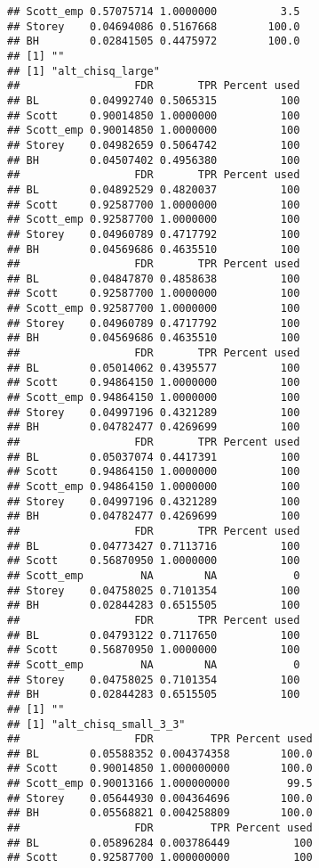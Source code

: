 \documentclass{article}\usepackage[]{graphicx}\usepackage[]{color}
\makeatletter
\newenvironment{kframe}{%
 \def\at@end@of@kframe{}%
 \ifinner\ifhmode%
  \def\at@end@of@kframe{\end{minipage}}%
  \begin{minipage}{\columnwidth}%
 \fi\fi%
 \def\FrameCommand##1{\hskip\@totalleftmargin \hskip-\fboxsep
 \colorbox{shadecolor}{##1}\hskip-\fboxsep
     \hskip-\linewidth \hskip-\@totalleftmargin \hskip\columnwidth}%
 \MakeFramed {\advance\hsize-\width
   \@totalleftmargin\z@ \linewidth\hsize
   \@setminipage}}%
 {\par\unskip\endMakeFramed%
 \at@end@of@kframe}
\newenvironment{knitrout}{}{} %
\makeatother
\begin{document}
\begin{knitrout}
\begin{kframe}
\begin{verbatim}
## Scott_emp 0.57075714 1.0000000          3.5
## Storey    0.04694086 0.5167668        100.0
## BH        0.02841505 0.4475972        100.0
## [1] ""
## [1] "alt_chisq_large"
##                  FDR       TPR Percent used
## BL        0.04992740 0.5065315          100
## Scott     0.90014850 1.0000000          100
## Scott_emp 0.90014850 1.0000000          100
## Storey    0.04982659 0.5064742          100
## BH        0.04507402 0.4956380          100
##                  FDR       TPR Percent used
## BL        0.04892529 0.4820037          100
## Scott     0.92587700 1.0000000          100
## Scott_emp 0.92587700 1.0000000          100
## Storey    0.04960789 0.4717792          100
## BH        0.04569686 0.4635510          100
##                  FDR       TPR Percent used
## BL        0.04847870 0.4858638          100
## Scott     0.92587700 1.0000000          100
## Scott_emp 0.92587700 1.0000000          100
## Storey    0.04960789 0.4717792          100
## BH        0.04569686 0.4635510          100
##                  FDR       TPR Percent used
## BL        0.05014062 0.4395577          100
## Scott     0.94864150 1.0000000          100
## Scott_emp 0.94864150 1.0000000          100
## Storey    0.04997196 0.4321289          100
## BH        0.04782477 0.4269699          100
##                  FDR       TPR Percent used
## BL        0.05037074 0.4417391          100
## Scott     0.94864150 1.0000000          100
## Scott_emp 0.94864150 1.0000000          100
## Storey    0.04997196 0.4321289          100
## BH        0.04782477 0.4269699          100
##                  FDR       TPR Percent used
## BL        0.04773427 0.7113716          100
## Scott     0.56870950 1.0000000          100
## Scott_emp         NA        NA            0
## Storey    0.04758025 0.7101354          100
## BH        0.02844283 0.6515505          100
##                  FDR       TPR Percent used
## BL        0.04793122 0.7117650          100
## Scott     0.56870950 1.0000000          100
## Scott_emp         NA        NA            0
## Storey    0.04758025 0.7101354          100
## BH        0.02844283 0.6515505          100
## [1] ""
## [1] "alt_chisq_small_3_3"
##                  FDR         TPR Percent used
## BL        0.05588352 0.004374358        100.0
## Scott     0.90014850 1.000000000        100.0
## Scott_emp 0.90013166 1.000000000         99.5
## Storey    0.05644930 0.004364696        100.0
## BH        0.05568821 0.004258809        100.0
##                  FDR         TPR Percent used
## BL        0.05896284 0.003786449          100
## Scott     0.92587700 1.000000000          100

\end{verbatim}
\end{kframe}
\end{knitrout}
\end{document}
